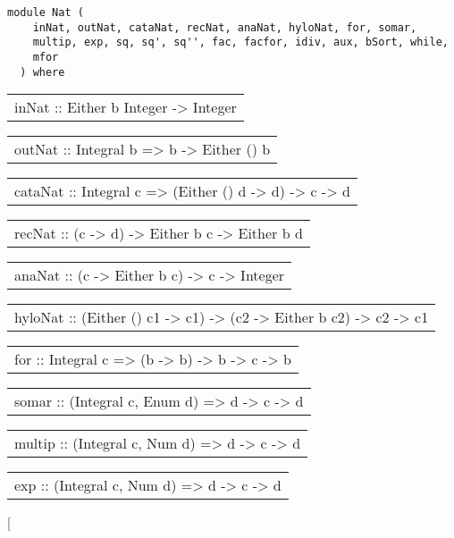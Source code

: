 \label{module:Nat}
\haddockbeginheader
{\haddockverb\begin{verbatim}
module Nat (
    inNat, outNat, cataNat, recNat, anaNat, hyloNat, for, somar,
    multip, exp, sq, sq', sq'', fac, facfor, idiv, aux, bSort, while,
    mfor
  ) where\end{verbatim}}
\haddockendheader

\begin{haddockdesc}
\item[\begin{tabular}{@{}l}
inNat :: Either b Integer -> Integer
\end{tabular}]
\item[\begin{tabular}{@{}l}
outNat :: Integral b => b -> Either () b
\end{tabular}]
\item[\begin{tabular}{@{}l}
cataNat :: Integral c => (Either () d -> d) -> c -> d
\end{tabular}]
\item[\begin{tabular}{@{}l}
recNat :: (c -> d) -> Either b c -> Either b d
\end{tabular}]
\item[\begin{tabular}{@{}l}
anaNat :: (c -> Either b c) -> c -> Integer
\end{tabular}]
\item[\begin{tabular}{@{}l}
hyloNat :: (Either () c1 -> c1) -> (c2 -> Either b c2) -> c2 -> c1
\end{tabular}]
\item[\begin{tabular}{@{}l}
for :: Integral c => (b -> b) -> b -> c -> b
\end{tabular}]
\item[\begin{tabular}{@{}l}
somar :: (Integral c, Enum d) => d -> c -> d
\end{tabular}]
\item[\begin{tabular}{@{}l}
multip :: (Integral c, Num d) => d -> c -> d
\end{tabular}]
\item[\begin{tabular}{@{}l}
exp :: (Integral c, Num d) => d -> c -> d
\end{tabular}]
\item[\begin{tabular}{@{}l}

\end{tabular}
\end{haddockdesc}

